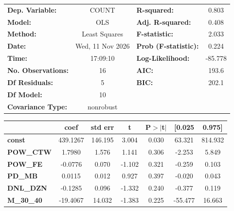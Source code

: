 \begin{center}
\begin{tabular}{lclc}
\toprule
\textbf{Dep. Variable:}    &      COUNT       & \textbf{  R-squared:         } &     0.803   \\
\textbf{Model:}            &       OLS        & \textbf{  Adj. R-squared:    } &     0.408   \\
\textbf{Method:}           &  Least Squares   & \textbf{  F-statistic:       } &     2.033   \\
\textbf{Date:}             & Wed, 11 Nov 2026 & \textbf{  Prob (F-statistic):} &    0.224    \\
\textbf{Time:}             &     17:09:10     & \textbf{  Log-Likelihood:    } &   -85.778   \\
\textbf{No. Observations:} &          16      & \textbf{  AIC:               } &     193.6   \\
\textbf{Df Residuals:}     &           5      & \textbf{  BIC:               } &     202.1   \\
\textbf{Df Model:}         &          10      & \textbf{                     } &             \\
\textbf{Covariance Type:}  &    nonrobust     & \textbf{                     } &             \\
\bottomrule
\end{tabular}
\begin{tabular}{lcccccc}
                   & \textbf{coef} & \textbf{std err} & \textbf{t} & \textbf{P$> |$t$|$} & \textbf{[0.025} & \textbf{0.975]}  \\
\midrule
\textbf{const}     &     439.1267  &      146.195     &     3.004  &         0.030        &       63.321    &      814.932     \\
\textbf{POW\_CTW}  &       1.7980  &        1.576     &     1.141  &         0.306        &       -2.253    &        5.849     \\
\textbf{POW\_FE}   &      -0.0776  &        0.070     &    -1.102  &         0.321        &       -0.259    &        0.103     \\
\textbf{PD\_MB}    &       0.0115  &        0.012     &     0.927  &         0.397        &       -0.020    &        0.043     \\
\textbf{DNL\_DZN}  &      -0.1285  &        0.096     &    -1.332  &         0.240        &       -0.377    &        0.119     \\
\textbf{M\_30\_40} &     -19.4067  &       14.032     &    -1.383  &         0.225        &      -55.477    &       16.663     \\

\end{tabular}
\end{center}
